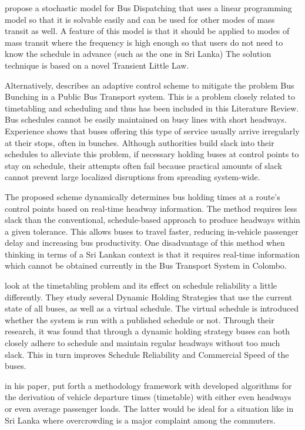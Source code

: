 \documentclass[12pt, oneside]{report}
\begin{document}
\citet{Riano2004} propose a stochastic model for Bus Dispatching that uses a linear programming model so that it is solvable easily and can be used for other modes of mass transit as well. A feature of this model is that it should be applied to modes of mass transit where the frequency is high enough so that users do not need to know the
schedule in advance (such as the one in Sri Lanka) The solution technique is based on a novel Transient Little Law.

Alternatively, \citet{Daganzo2008} describes an adaptive control scheme to mitigate the problem Bus Bunching in a Public Bus Transport system. This is a problem closely related to timetabling and scheduling and thus has been included in this Literature Review. Bus schedules cannot be easily maintained on busy lines with short headways. Experience shows that buses offering this type of service usually arrive irregularly at their stops, often in bunches. Although authorities build slack into their schedules to alleviate this problem, if necessary holding buses at control points to stay on schedule, their attempts often fail because practical amounts of slack cannot prevent large localized disruptions from spreading system-wide. 

The proposed scheme dynamically determines bus holding times at a route’s control points based on real-time headway information. The method requires less slack than the conventional, schedule-based approach to produce headways within a given tolerance. This allows buses to travel faster, reducing in-vehicle passenger delay and increasing bus productivity. One disadvantage of this method when thinking in terms of a Sri Lankan context is that it requires real-time information which cannot be obtained currently in the Bus Transport System in Colombo.

\citet{Xuan2011} look at the timetabling problem and its effect on schedule reliability a little differently. They study several Dynamic Holding Strategies that use the current state of all buses, as well as a virtual schedule. The virtual schedule is introduced whether the system is run with a 
published schedule or not. Through their research, it was found that through a dynamic holding strategy buses can both closely adhere to schedule and maintain regular headways without too much slack. This in turn improves Schedule Reliability and Commercial Speed of the buses.

\citet{Ceder2009} in his paper, put forth a methodology framework with developed algorithms for the derivation of vehicle departure times (timetable) with either even headways or even average passenger loads. The latter would be ideal for a situation like in Sri Lanka where overcrowding is a major complaint among the commuters.
\end{document}
